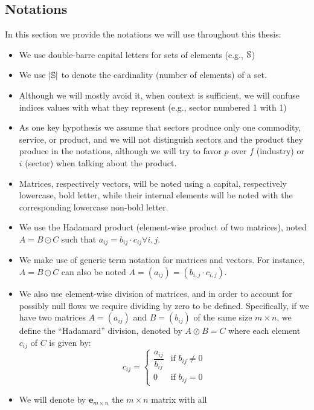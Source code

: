 \documentclass[main.tex]{subfiles}
\begin{document}
\subsection{Notations}
\label{sec:notations}

In this section we
provide the notations we will use throughout this thesis:

\begin{itemize}
\item We use double-barre capital letters for sets of elements (e.g., $\mathbb{S}$)
\item We use $|\mathbb{S}|$ to denote the cardinality (number of elements) of a
  set.
\item Although we will mostly avoid it, when context is sufficient, we will
  confuse indices values with what they represent (e.g., sector numbered 1 with
  1)
\item As one key hypothesis we assume that sectors produce only one
  commodity, service, or product, and we will not distinguish sectors
  and the product they produce in the notations, although we will try to favor
  $p$ over $f$ (industry) or $i$ (sector) when talking about the product.
\item Matrices, respectively vectors, will be noted using a capital,
  respectively lowercase, bold letter, while their internal elements will be
  noted with the corresponding lowercase non-bold letter.
\item We use the Hadamard product (element-wise product of two matrices), noted $A = B
  \odot C$ such that $a_{ij} = b_{ij} \cdot c_{ij} \forall i,j$.
\item We make use of generic term notation for matrices and vectors. For
  instance, $A = B \odot C$ can also be noted $A = (a_{ij}) = (b_{i,j} \cdot
  c_{i,j})$.
\item We also use element-wise division of matrices, and in order to account for
  possibly null flows we require dividing by zero to be defined. Specifically,
  if we have two matrices $A = (a_{ij})$ and $B = (b_{ij})$ of
  the same size $m \times n$, we define the ``Hadamard'' division, denoted by $A
  \oslash B = C$ where each element $c_{ij}$ of $C$ is given by:
  \[
    c_{ij} =
    \begin{cases}
      \dfrac{a_{ij}}{b_{ij}} & \text{if } b_{ij} \neq 0\\
      0 & \text{if } b_{ij} = 0
    \end{cases}
  \]
\item We will denote by $\bm{e}_{m \times n}$ the $m \times n$ matrix with all

\end{itemize}
\end{document}
